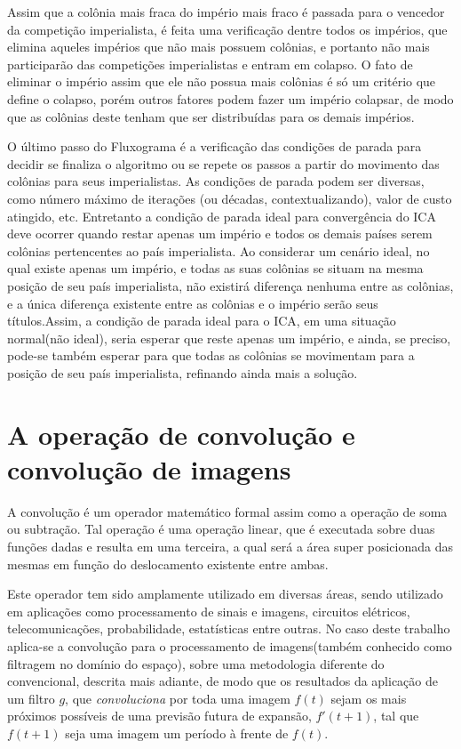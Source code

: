 Assim que a colônia mais fraca do império mais fraco é passada para o vencedor da competição imperialista, é feita uma verificação dentre todos os impérios, que elimina aqueles impérios que não mais possuem colônias, e portanto não mais participarão das competições imperialistas e entram em colapso. O fato de eliminar o império assim que ele não possua mais colônias é só um critério que define o colapso, porém outros fatores podem fazer um império colapsar, de modo que as colônias deste tenham que ser distribuídas para os demais impérios.

	O último passo do Fluxograma é a verificação das condições de parada para decidir se finaliza o algoritmo ou se repete os passos a partir do movimento das colônias para seus imperialistas. As condições de parada podem ser diversas, como número máximo de iterações (ou décadas, contextualizando), valor de custo atingido, etc.  Entretanto a condição de parada ideal para convergência do ICA deve ocorrer quando restar apenas um império e todos os demais países serem colônias pertencentes ao país imperialista. Ao considerar um cenário ideal, no qual existe apenas um império, e todas as suas colônias se situam na mesma posição de seu país imperialista, não existirá diferença nenhuma entre as colônias, e a única diferença existente entre as colônias e o império serão seus títulos.Assim, a condição de parada ideal para o ICA, em uma situação normal(não ideal), seria esperar que reste apenas um império, e ainda, se preciso, pode-se também esperar para que todas as colônias se movimentam para a posição de seu país imperialista, refinando ainda mais a solução.










\section{A operação de convolução e convolução de imagens}
   
A convolução é um operador matemático formal assim como a operação de soma ou subtração. Tal operação é uma operação linear, que é executada sobre duas funções dadas e resulta em uma terceira, a qual será a área super posicionada das mesmas em função do deslocamento existente entre ambas.

Este operador tem sido amplamente utilizado em diversas áreas, sendo utilizado em aplicações como processamento de sinais e imagens, circuitos elétricos, telecomunicações, probabilidade, estatísticas entre outras. No caso deste trabalho aplica-se a convolução para o processamento de imagens(também conhecido como filtragem no domínio do espaço), sobre uma metodologia diferente do convencional, descrita mais adiante, de modo que os resultados da aplicação de um filtro \(g\), que \emph{convoluciona} por toda uma imagem \(f(t)\) sejam os mais próximos possíveis de uma previsão futura de expansão, \(f'(t+1)\), tal que \(f(t+1)\) seja uma imagem um período à frente de \(f(t)\).

